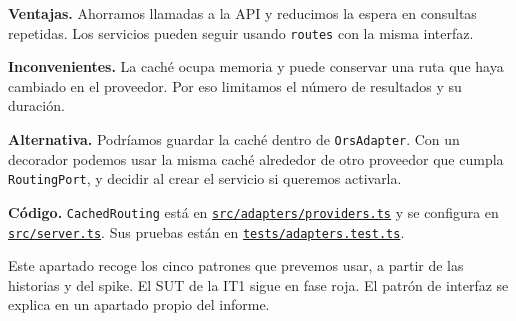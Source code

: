 \documentclass[10pt,a4paper]{article}
\newcommand{\fuente}[2]{\href{https://github.com/Kiliansito/ei1039-ei1048-movilidad/blob/dce2b57/entrega1/02_Spike/#1}{\texttt{\small #2}}}
\begin{document}
\textbf{Ventajas.} Ahorramos llamadas a la API y reducimos la espera en consultas repetidas. Los servicios pueden seguir usando \texttt{routes} con la misma interfaz.

\textbf{Inconvenientes.} La caché ocupa memoria y puede conservar una ruta que haya cambiado en el proveedor. Por eso limitamos el número de resultados y su duración.

\textbf{Alternativa.} Podríamos guardar la caché dentro de \texttt{OrsAdapter}. Con un decorador podemos usar la misma caché alrededor de otro proveedor que cumpla \texttt{RoutingPort}, y decidir al crear el servicio si queremos activarla.

\textbf{Código.} \texttt{CachedRouting} está en \fuente{src/adapters/providers.ts}{src/adapters/providers.ts} y se configura en \fuente{src/server.ts}{src/server.ts}. Sus pruebas están en \fuente{tests/adapters.test.ts}{tests/adapters.test.ts}.

\vfill
{\small Este apartado recoge los cinco patrones que prevemos usar, a partir de las historias y del spike. El SUT de la IT1 sigue en fase roja. El patrón de interfaz se explica en un apartado propio del informe.}
\end{document}

